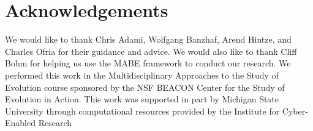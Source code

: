 \section{Acknowledgements}

We would like to thank Chris Adami, Wolfgang Banzhaf, Arend Hintze, and Charles Ofria for their guidance and advice.
We would also like to thank Cliff Bohm for helping us use the MABE framework to conduct our research.
We performed this work in the Multidisciplinary Approaches to the Study of Evolution course sponsored by the NSF BEACON Center for the Study of Evolution in Action.
This work was supported in part by Michigan State University through computational resources provided by the Institute for Cyber-Enabled Research
